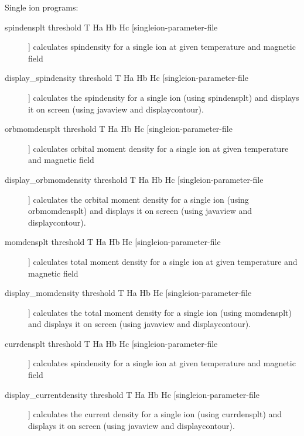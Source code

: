 Single ion programs:
\begin{description}
\item [spindensplt threshold T Ha Hb Hc [singleion-parameter-file]]
 calculates spindensity for a single ion at given temperature and magnetic field
\item [display\_spindensity  threshold T Ha Hb Hc [singleion-parameter-file]]
 calculates the spindensity for a single ion (using {\prg spindensplt})
 and displays it on screen (using {\prg javaview} and {\prg displaycontour}).
\item [orbmomdensplt threshold T Ha Hb Hc [singleion-parameter-file]]
 calculates orbital moment density for a single ion at given temperature and magnetic field
\item [display\_orbmomdensity  threshold T Ha Hb Hc [singleion-parameter-file]]
 calculates the orbital moment density for a single ion (using {\prg orbmomdensplt})
 and displays it on screen (using {\prg javaview} and {\prg displaycontour}).
\item [momdensplt threshold T Ha Hb Hc [singleion-parameter-file]]
 calculates total moment density for a single ion at given temperature and magnetic field
\item [display\_momdensity  threshold T Ha Hb Hc [singleion-parameter-file]]
 calculates the total moment density for a single ion (using {\prg momdensplt})
 and displays it on screen (using {\prg javaview} and {\prg displaycontour}).
\item [currdensplt threshold T Ha Hb Hc [singleion-parameter-file]]
 calculates spindensity for a single ion at given temperature and magnetic field
\item [display\_currentdensity  threshold T Ha Hb Hc [singleion-parameter-file]]
 calculates the current density for a single ion (using {\prg currdensplt})
 and displays it on screen (using {\prg javaview} and {\prg displaycontour}).


\end{description}
